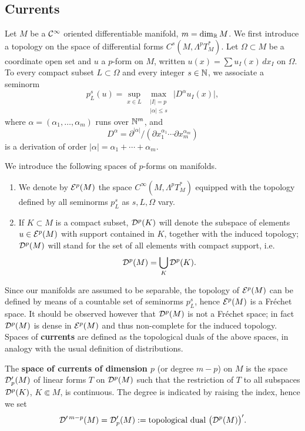 \documentclass[12pt]{article}
\begin{document}
\subsection{Currents}
Let $M$ be a ${\mathcal{C}}^\infty$ oriented differentiable manifold, $m=\dim_{\mathbb{R}} M$.
We first introduce a topology on the space of differential forms
$C^s(M,\Lambda^p T_M^*)$.
Let $\Omega\subset M$ be a coordinate open set and $u$ a $p$-form on $M$,
written $u(x)=\sum u_I(x)\,dx_I$ on $\Omega$.
To every compact subset $L\subset\Omega$ and every integer $s\in\mathbb{N}$,
we associate a seminorm
\[
  p^s_L(u)
  =\sup_{x\in L}\ \max_{\substack{|I|=p\\|\alpha|\le s}}\,
   \bigl|D^\alpha u_I(x)\bigr|,
\]
where $\alpha=(\alpha_1,\dots,\alpha_m)$ runs over $\mathbb{N}^m$, and
\[
  D^\alpha=\partial^{|\alpha|}
           /(\partial x_1^{\alpha_1}\cdots\partial x_m^{\alpha_m})
\]
is a derivation of order $|\alpha|=\alpha_1+\cdots+\alpha_m$.

\begin{definition}
We introduce the following spaces of $p$-forms on manifolds.
\begin{enumerate}[label=\textnormal{(\alph*)}]
\item
We denote by ${\mathcal{E}}^p(M)$  the space
$C^\infty(M,\Lambda^p T_M^*)$ equipped with the topology defined by all seminorms $p_L^s$ as $s,L,\Omega$
vary.

\item
If $K\subset M$ is a compact subset, ${\mathcal{D}}^p(K)$ will denote the subspace
of elements $u\in{\mathcal{E}}^p(M)$ with support contained in $K$, together with
the induced topology; ${\mathcal{D}}^p(M)$ will stand for the set of all elements
with compact support, i.e.
\[
  {\mathcal{D}}^p(M)=\bigcup_K {\mathcal{D}}^p(K).
\]
\end{enumerate}
\end{definition}

Since our manifolds are assumed to be separable, the topology of
${\mathcal{E}}^p(M)$ can be defined by means of a countable set of seminorms
$p^s_L$, hence ${\mathcal{E}}^p(M)$ is a Fréchet space.
It should be observed however that ${\mathcal{D}}^p(M)$ is not a Fréchet space;
in fact ${\mathcal{D}}^p(M)$ is dense in ${\mathcal{E}}^p(M)$ and thus non-complete for the induced topology. Spaces of \textbf{currents} are defined as the topological duals of the above spaces, in analogy with the usual definition of distributions.

\begin{definition}
The \textbf{space of currents of dimension $p$} (or degree $m-p$) on $M$
is the space ${\mathcal{D}}'_p(M)$ of linear forms $T$ on ${\mathcal{D}}^p(M)$ such that the
restriction of $T$ to all subspaces ${\mathcal{D}}^p(K)$, $K\Subset M$, is
continuous.
The degree is indicated by raising the index, hence we set
\[
  {\mathcal{D}}'^{\,m-p}(M) = {\mathcal{D}}'_p(M) := \text{topological dual }\bigl({\mathcal{D}}^p(M)\bigr)'.
\]
\end{definition}
\end{document}
